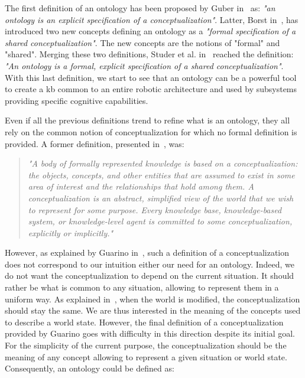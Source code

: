The first definition of an ontology has been proposed by Guber in~\cite{guber_1993_translational} as: \textit{"an ontology is an explicit specification of a conceptualization"}. Latter, Borst in~\cite{borst_1999_construction}, has introduced two new concepts defining an ontology as a \textit{"formal specification of a shared conceptualization"}. The new concepts are the notions of "formal" and "shared". Merging these two definitions, Studer et al. in~\cite{studer_1998_knowledge} reached the definition: \textit{"An ontology is a formal, explicit specification of a shared conceptualization"}. With this last definition, we start to see that an ontology can be a powerful tool to create a \acrfull{kb} common to an entire robotic architecture and used by subsystems providing specific cognitive capabilities.

Even if all the previous definitions trend to refine what is an ontology, they all rely on the common notion of conceptualization for which no formal definition is provided. A former definition, presented in~\cite{genesereth_1987_logical}, was:

\begin{quote} 
\centering 
\textit{
"A body of formally represented knowledge is based on a conceptualization: the objects, concepts, and other entities that are assumed to exist in some area of interest and the relationships that hold among them. A conceptualization is an abstract, simplified view of the world that we wish to represent for some purpose. Every knowledge base, knowledge-based system, or knowledge-level agent is committed to some conceptualization, explicitly or implicitly."}
\end{quote}

However, as explained by Guarino in~\cite{guarino_2009_ontology}, such a definition of a conceptualization does not correspond to our intuition either our need for an ontology. Indeed, we do not want the conceptualization to depend on the current situation. It should rather be what is common to any situation, allowing to represent them in a uniform way. As explained in~\cite{guarino_1995_towards}, when the world is modified, the conceptualization should stay the same. We are thus interested in the meaning of the concepts used to describe a world state. However, the final definition of a conceptualization provided by Guarino goes with difficulty in this direction despite its initial goal. For the simplicity of the current purpose, the conceptualization should be the meaning of any concept allowing to represent a given situation or world state. Consequently, an ontology could be defined as:

